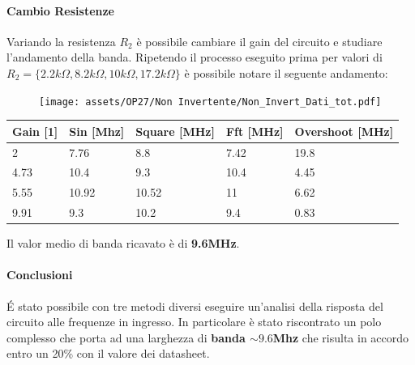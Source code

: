 \paragraph{Cambio Resistenze}
Variando la resistenza $R_2$ è possibile cambiare il gain del circuito e studiare l'andamento della banda.
Ripetendo il processo eseguito prima per valori di $R_2 = \{2.2k\Omega, 8.2k\Omega, 10k\Omega, 17.2k\Omega\}$ è possibile notare il seguente andamento: 

\begin{figure}[!h]
    \centering
    \texttt{[image: assets/OP27/Non Invertente/Non\_Invert\_Dati\_tot.pdf]}
        \label{fig:OP27 overshoot non invertente}
\end{figure}

\begin{table}[!h]
    \centering
    \begin{tabular}{|l|l|l|l|l|}
            \hline
            \textbf{Gain {[}1{]}} & \textbf{Sin {[}Mhz{]}} & \textbf{Square {[}MHz{]}} & \textbf{Fft {[}MHz{]}} & \textbf{Overshoot {[}MHz{]}} \\ \hline
            2             & 7.76         & 8.8             & 7.42         & 19.8               \\ \hline
            4.73          & 10.4         & 9.3             & 10.4         & 4.45               \\ \hline
            5.55          & 10.92        & 10.52           & 11           & 6.62               \\ \hline
            9.91          & 9.3          & 10.2            & 9.4          & 0.83               \\ \hline
        \end{tabular}
\end{table}

Il valor medio di banda ricavato è di \textbf{9.6MHz}.

\paragraph{Conclusioni}
 \'E stato possibile con tre metodi diversi eseguire un'analisi della risposta del circuito alle frequenze in ingresso. In particolare è stato riscontrato un polo complesso che porta ad una larghezza di \textbf{banda $\sim 9.6$Mhz} che risulta in accordo entro un 20\% con il valore dei datasheet.

